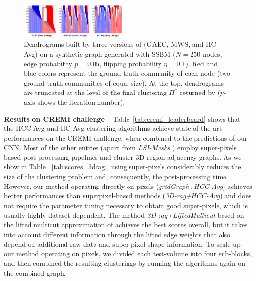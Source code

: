 \begin{figure}
\centering
\includegraphics[width=0.48\textwidth,trim=80 10 60 0, clip]{./figs/dendrograms/new_agglo_order.png} %
\caption{Dendrograms built by three versions of \algname{} (GAEC, MWS, and HC-Avg) on a synthetic graph generated with SSBM ($N=250$ nodes, edge probability $p=0.05$, flipping probability $\eta=0.1$).  Red and blue colors represent the ground-truth community of each node (two ground-truth communities of equal size). At the top, dendrograms are truncated at the level of the final clustering $\Pi^*$ returned by \algname{} (y-axis shows the iteration number). \label{fig:dendrograms}}
\end{figure}






\textbf{Results on CREMI challenge} -- 
Table~\ref{tab:cremi_leaderboard} shows that the HCC-Avg and HC-Avg clustering algorithms achieve state-of-the-art performances on the CREMI challenge, when combined to the predictions of our CNN.
Most of the other entries (apart from \emph{LSI-Masks} \cite{bailoni2020proposal}) employ super-pixels based post-processing pipelines and cluster 3D-region-adjacency graphs. As we show in Table ~\ref{tab:scores_3drag}, using super-pixels considerably reduces the size of the clustering problem and, consequently, the post-processing time. 
However, our method operating directly on pixels (\emph{gridGraph+HCC-Avg}) achieves better performances than superpixel-based methods (\emph{3D-rag+HCC-Avg}) and does not require the parameter tuning necessary to obtain good super-pixels, which is usually highly dataset dependent.
The method \emph{3D-rag+LiftedMulticut} based on the lifted multicut approximation of \cite{beier2017multicut} achieves the best scores overall, but it takes into account different information through the lifted edge weights that also depend on additional raw-data and super-pixel shape information. 
To scale up our method operating on pixels, we divided each test-volume into four sub-blocks, and then combined the resulting clusterings by running the algorithms again on the combined graph.

